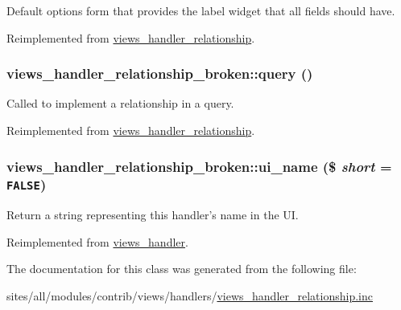Default options form that provides the label widget that all fields should have. 

Reimplemented from \hyperlink{classviews__handler__relationship_08cc3f5947964d936b5e88d198f82c30}{views\_\-handler\_\-relationship}.\hypertarget{classviews__handler__relationship__broken_58db24781460cd5b36c08c56df9d56ab}{
\subsubsection[{query}]{\setlength{\rightskip}{0pt plus 5cm}views\_\-handler\_\-relationship\_\-broken::query ()}}
\label{classviews__handler__relationship__broken_58db24781460cd5b36c08c56df9d56ab}


Called to implement a relationship in a query. 

Reimplemented from \hyperlink{classviews__handler__relationship_7dc0b6371807dbf06efa594cb52b3348}{views\_\-handler\_\-relationship}.\hypertarget{classviews__handler__relationship__broken_d6a2ac8a5183f5293745ce27b55ac390}{
\subsubsection[{ui\_\-name}]{\setlength{\rightskip}{0pt plus 5cm}views\_\-handler\_\-relationship\_\-broken::ui\_\-name (\$ {\em short} = {\tt FALSE})}}
\label{classviews__handler__relationship__broken_d6a2ac8a5183f5293745ce27b55ac390}


Return a string representing this handler's name in the UI. 

Reimplemented from \hyperlink{classviews__handler_e81019ed08d9c3f5bca3d16c69e7b39f}{views\_\-handler}.

The documentation for this class was generated from the following file:\begin{CompactItemize}
\item 
sites/all/modules/contrib/views/handlers/\hyperlink{views__handler__relationship_8inc}{views\_\-handler\_\-relationship.inc}\end{CompactItemize}
